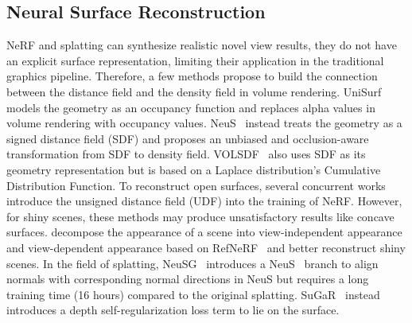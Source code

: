 \subsection{Neural Surface Reconstruction}
 NeRF and  splatting can synthesize realistic novel view results, they do not have an explicit surface representation, limiting their application in the traditional graphics pipeline. 
Therefore, a few methods propose to build the connection between the distance field and the density field in volume rendering. 
UniSurf~\cite{UNISURF} models the geometry as an occupancy function and replaces alpha values in volume rendering with occupancy values. 
NeuS~\cite{NeuS} instead treats the geometry as a signed distance field (SDF) and proposes an unbiased and occlusion-aware transformation from SDF to density field. 
VOLSDF~\cite{VolSDF} also uses SDF as its geometry representation but is based on a Laplace distribution's Cumulative Distribution Function. 
To reconstruct open surfaces, several concurrent works~\cite{NeUDF, NeuralUDF, NeAT} introduce the unsigned distance field (UDF) into the training of NeRF. 
However, for shiny scenes, these methods may produce unsatisfactory results like concave surfaces. 
\cite{Factored-NeuS, DE-NeRF, Ref-NeuS} decompose the appearance of a scene into view-independent appearance and view-dependent appearance based on RefNeRF~\cite{RefNeRF} and better reconstruct shiny scenes. 
In the field of  splatting, NeuSG~\cite{NeuSG} introduces a NeuS~\cite{NeuS} branch to align  normals with corresponding normal directions in NeuS but requires a long training time (16 hours) compared to the original  splatting. 
SuGaR~\cite{SuGaR} instead introduces a depth self-regularization loss term to  lie on the surface. 

